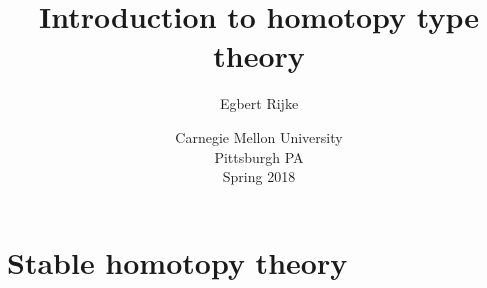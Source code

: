 \documentclass[11pt]{memoir} %
\title{Introduction to homotopy type theory}
\author{Egbert Rijke}
\date{Carnegie Mellon University\\Pittsburgh PA\\Spring 2018}
\begin{document}
\frontmatter

\begin{titlingpage}
\maketitle 
\end{titlingpage}

\tableofcontents

%



\mainmatter 





























%





















\chapter{Stable homotopy theory}


\end{document}
